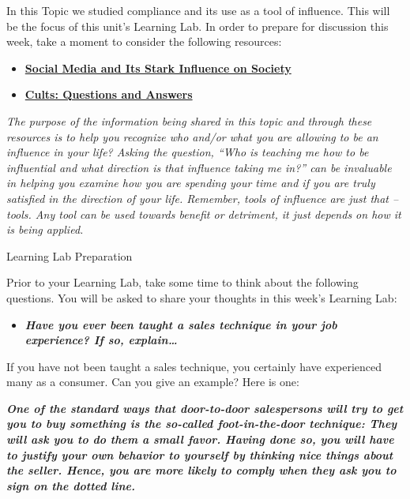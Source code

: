 \documentclass[
]{book}
\providecommand{\tightlist}{%
  \setlength{\itemsep}{0pt}\setlength{\parskip}{0pt}}
\begin{document}
\begin{reflect}
In this Topic we studied compliance and its use as a tool of influence. This will be the focus of this unit's Learning Lab. In order to prepare for discussion this week, take a moment to consider the following resources:

\begin{itemize}
\tightlist
\item
  \href{https://scholarworks.bgsu.edu/cgi/viewcontent.cgi?article=1004\&context=writ}{\textbf{Social Media and Its Stark Influence on Society }}\\
\item
  \href{https://cultrecovery101.com/cults-questions-and-answers/}{\textbf{Cults: Questions and Answers}}
\end{itemize}

\emph{The purpose of the information being shared in this topic and through these resources is to help you recognize who and/or what you are allowing to be an influence in your life? Asking the question, ``Who is teaching me how to be influential and what direction is that influence taking me in?'' can be invaluable in helping you examine how you are spending your time and if you are truly satisfied in the direction of your life. Remember, tools of influence are just that -- tools. Any tool can be used towards benefit or detriment, it just depends on how it is being applied.}

{Learning Lab Preparation}

Prior to your Learning Lab, take some time to think about the following questions. You will be asked to share your thoughts in this week's Learning Lab:

\begin{itemize}
\tightlist
\item
  \textbf{\emph{Have you ever been taught a sales technique in your job experience? If so, explain\ldots{}}}
\end{itemize}

If you have not been taught a sales technique, you certainly have experienced many as a consumer. Can you give an example? Here is one:

\textbf{\emph{One of the standard ways that door-to-door salespersons will try to get you to buy something is the so-called foot-in-the-door technique: They will ask you to do them a small favor. Having done so, you will have to justify your own behavior to yourself by think­ing nice things about the seller. Hence, you are more likely to comply when they ask you to sign on the dotted line.}}
\end{reflect}
\end{document}
